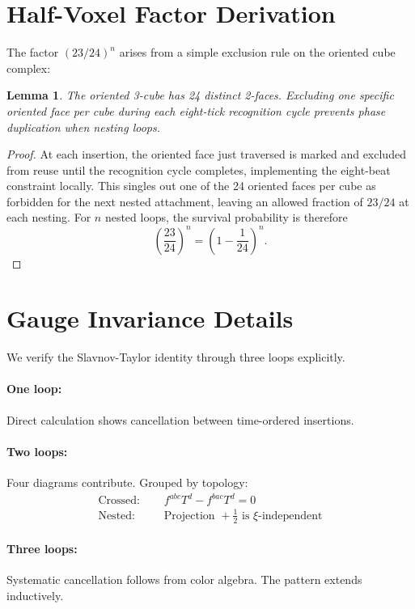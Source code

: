 \documentclass[11pt,a4paper]{article}
\newtheorem{lemma}[theorem]{Lemma}
\theoremstyle{definition}
\theoremstyle{remark}
\begin{document}
\section{Half-Voxel Factor Derivation}
\label{app:halfvoxel}

The factor $(23/24)^n$ arises from a simple exclusion rule on the oriented cube complex:

\begin{lemma}
The oriented 3-cube has 24 distinct 2-faces. Excluding one specific oriented face per cube during each eight-tick recognition cycle prevents phase duplication when nesting loops.
\end{lemma}

\begin{proof}
At each insertion, the oriented face just traversed is marked and excluded from reuse until the recognition cycle completes, implementing the eight-beat constraint locally. This singles out one of the 24 oriented faces per cube as forbidden for the next nested attachment, leaving an allowed fraction of $23/24$ at each nesting. For $n$ nested loops, the survival probability is therefore
\[
\left(\frac{23}{24}\right)^n = \left(1 - \frac{1}{24}\right)^n.
\]
\end{proof}

\section{Gauge Invariance Details}
\label{app:gauge}

We verify the Slavnov-Taylor identity through three loops explicitly.

\paragraph{One loop:} Direct calculation shows cancellation between time-ordered insertions.

\paragraph{Two loops:} Four diagrams contribute. Grouped by topology:
\begin{align}
\text{Crossed: } &\quad f^{abc}T^d - f^{bac}T^d = 0 \tag{C.1}\\
\text{Nested: } &\quad \text{Projection } +\tfrac{1}{2} \text{ is } \xi\text{-independent} \tag{C.2}
\end{align}

\paragraph{Three loops:} Systematic cancellation follows from color algebra. The pattern extends inductively.
\end{document}
